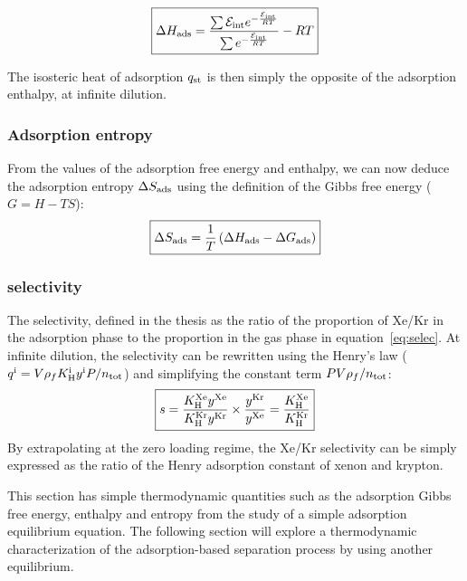 \documentclass[main.tex]{subfiles}
\begin{document}
\begin{equation}\label{eq:ads_enthalpy}
  \boxed{
  \Delta H_{\text{ads}} = \dfrac{\sum \mathcal{E}_{\text{int}}e^{-\frac{\mathcal{E}_{\text{int}}}{RT}}}{\sum e^{-\frac{\mathcal{E}_{\text{int}}}{RT}}} - RT
  }
\end{equation}

The isosteric heat of adsorption $q_{\text{st}}$ is then simply the opposite of the adsorption enthalpy, at infinite dilution. 

\subsubsection{Adsorption entropy}

From the values of the adsorption free energy and enthalpy, we can now deduce the adsorption entropy $\Delta S_{\text{ads}}$ using the definition of the Gibbs free energy ($G = H-TS$):
\begin{equation}\label{eq:ads_entropy}
  \boxed{
  \Delta S_{\text{ads}} = \dfrac{1}{T} \left(\Delta H_{\text{ads}} - \Delta G_{\text{ads}} \right)
  }
\end{equation}

\subsubsection{selectivity}

The selectivity, defined in the thesis as the ratio of the proportion of Xe/Kr in the adsorption phase to the proportion in the gas phase in equation~\ref{eq:selec}. At infinite dilution, the selectivity can be rewritten using the Henry's law ($q^{\text{i}}=V\rho_f K_{\text{H}}^{\text{i}}y^{\text{i}}P/n_{\text{tot}}$) and simplifying the constant term $PV\rho_f/n_{\text{tot}}$:
\begin{equation}\label{eq:selec_0}
  \boxed{
  s = \dfrac{K_{\text{H}}^{\text{Xe}}y^{\text{Xe}}}{K_{\text{H}}^{\text{Kr}}y^{\text{Kr}}}\times\dfrac{y^{\text{Kr}}}{y^{\text{Xe}}} = \dfrac{K_{\text{H}}^{\text{Xe}}}{K_{\text{H}}^{\text{Kr}}}
  }
\end{equation}
By extrapolating at the zero loading regime, the Xe/Kr selectivity can be simply expressed as the ratio of the Henry adsorption constant of xenon and krypton.

This section has simple thermodynamic quantities such as the adsorption Gibbs free energy, enthalpy and entropy from the study of a simple adsorption equilibrium equation. The following section will explore a thermodynamic characterization of the adsorption-based separation process by using another equilibrium. 
\end{document}
